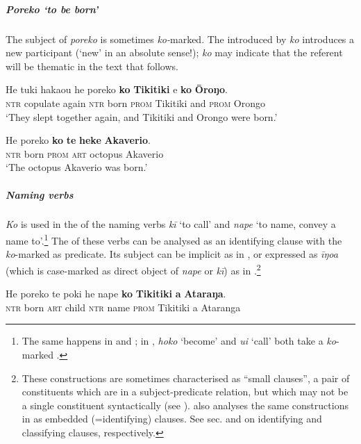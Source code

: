 \subparagraph{\textit{Poreko} ‘to be born’} The subject of \textit{poreko} is sometimes \textit{ko-}marked. The  introduced by \textit{ko} introduces a new participant (‘new’ in an absolute sense!); \textit{ko} may indicate that the referent will be thematic in the text that follows.

\ea\label{ex:8.145}
\gll He tuki haka{\ꞌ}ou he poreko \textbf{ko} \textbf{Tikitiki} {\ꞌ}e \textbf{ko} \textbf{{\ꞌ}Ōroŋo}. \\
\textsc{ntr} copulate again \textsc{ntr} born \textsc{prom} Tikitiki and \textsc{prom} Orongo \\

\glt 
‘They slept together again, and Tikitiki and Orongo were born.’ \textstyleExampleref{[R234.007]} 
\z

\ea\label{ex:8.146}
\gll He poreko \textbf{ko} \textbf{te} \textbf{heke} \textbf{{\ꞌ}Akaverio}. \\
\textsc{ntr} born \textsc{prom} \textsc{art} octopus Akaverio \\

\glt 
‘The octopus Akaverio was born.’ \textstyleExampleref{[Mtx-7-14.003]}
\z

\subparagraph{Naming verbs} \textit{Ko} is used in the  of the naming verbs \textit{kī} ‘to call’ and \textit{nape} ‘to name, convey a name to’.\footnote{\label{fn:441}The same happens in  and  \citep[45]{Clark1976}; in , \textit{hoko} ‘become’ and \textit{ui} ‘call’ both take a \textit{ko}{}-marked .} The  of these verbs can be analysed as an identifying clause with the \textit{ko}{}-marked  as predicate. Its subject can be implicit as in , or expressed as \textit{{\ꞌ}īŋoa} (which is case-marked as direct object of \textit{nape} or \textit{kī}) as in .\footnote{\label{fn:442}These constructions are sometimes characterised as “small clauses”, a pair of constituents which are in a subject{}-predicate relation, but which may not be a single constituent syntactically (see \citealt{Bowers2001}). \citet[12]{Bauer1991} also analyses the same constructions in  as embedded  (=identifying) clauses. See sec.  and  on identifying and classifying clauses, respectively.}  

\ea\label{ex:8.147}
\gll He poreko te poki he nape \textbf{ko} \textbf{Tikitiki} \textbf{{\ꞌ}a} \textbf{Ataraŋa}. \\
\textsc{ntr} born \textsc{art} child \textsc{ntr} name \textsc{prom} Tikitiki a Ataranga \\


